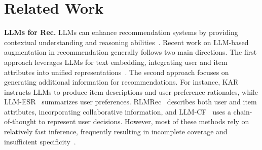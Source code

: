 \section{Related Work}

\textbf{LLMs for Rec.} LLMs can enhance recommendation systems by providing contextual understanding and reasoning abilities~\citep{huang2022towards}. Recent work on LLM-based augmentation in recommendation generally follows two main directions. The first approach leverages LLMs for text embedding, integrating user and item attributes into unified representations~\citep{hou2024bridging, zhang2024text, sheng2024language, lee2024star, yuan2023go}. The second approach focuses on generating additional information for recommendations. For instance, KAR~\citep{xi2024towards} instructs LLMs to produce item descriptions and user preference rationales, while LLM-ESR~\citep{liu2024llm} summarizes user preferences. RLMRec~\citep{ren2024representation} describes both user and item attributes, incorporating collaborative information, and LLM-CF~\citep{sun2024large} uses a chain-of-thought to represent user decisions. However, most of these methods rely on relatively fast inference, frequently resulting in incomplete coverage and insufficient specificity~\citep{ji2025test}.

